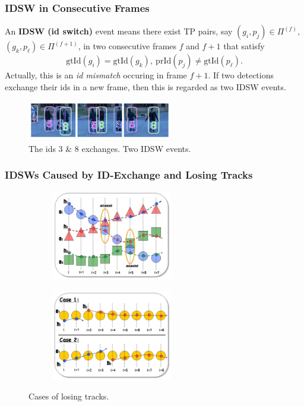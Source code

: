 \documentclass[slidetop, mathserif]{beamer}
\begin{document}
\begin{frame}
	\frametitle{IDSW in Consecutive Frames}
			
	An {\bf IDSW (id switch)} event means there exist TP pairs, say $(g_i, p_j)\in\Pi^{(f)}$,
	$(g_k, p_\ell)\in\Pi^{(f+1)}$, in two consecutive frames
	$f$ and $f+1$ that satisfy
	\[
		\text{gtId}(g_i) = \text{gtId}(g_k),\ 
		\text{prId}(p_j) \neq \text{gtId}(p_\ell).
	\]
	Actually, this is an \emph{id mismatch} occuring in frame $f+1$.
	If two detections exchange their ids in a new frame,
	then this is regarded as two IDSW events.
	\begin{figure}
		\includegraphics[width=180pt]{pics/fig3.png}
		\caption{The ids 3 \& 8 exchanges. Two IDSW events.}
	\end{figure}
			    
\end{frame}

\begin{frame}
	\frametitle{IDSWs Caused by ID-Exchange and Losing Tracks}

	\begin{figure}
		\begin{subfigure}{.49\textwidth}
			\includegraphics[width=150pt]{pics/fig16.png}
		\end{subfigure}
		\begin{subfigure}{.49\textwidth}
			\includegraphics[width=150pt]{pics/fig17.png}
		\end{subfigure}
		\caption{Cases of losing tracks.}
	\end{figure}
\end{frame}
\end{document}
